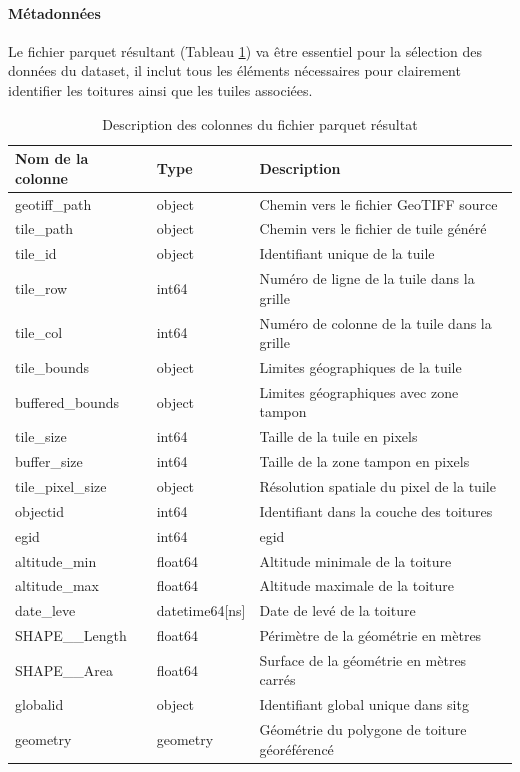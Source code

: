 \paragraph{Métadonnées}
Le fichier parquet résultant (Tableau \ref{tab:ch3_preparation_donnees_orthophotos_parquet_resultat}) va être essentiel pour la sélection des données du dataset, il inclut tous les éléments nécessaires pour clairement identifier les toitures ainsi que les tuiles associées.
\begin{table}[H]
    \centering
    \begin{tabular}{@{}llp{}@{}}
    \toprule
    \textbf{Nom de la colonne} & \textbf{Type} & \textbf{Description} \\
    \midrule
    geotiff\_path & object & Chemin vers le fichier GeoTIFF source \\
    tile\_path & object & Chemin vers le fichier de tuile généré \\
    tile\_id & object & Identifiant unique de la tuile \\
    tile\_row & int64 & Numéro de ligne de la tuile dans la grille \\
    tile\_col & int64 & Numéro de colonne de la tuile dans la grille \\
    tile\_bounds & object & Limites géographiques de la tuile \\
    buffered\_bounds & object & Limites géographiques avec zone tampon \\
    tile\_size & int64 & Taille de la tuile en pixels \\
    buffer\_size & int64 & Taille de la zone tampon en pixels \\
    tile\_pixel\_size & object & Résolution spatiale du pixel de la tuile \\
    objectid & int64 & Identifiant dans la couche des toitures \\
    egid & int64 & \gls{egid} \\
    altitude\_min & float64 & Altitude minimale de la toiture \\
    altitude\_max & float64 & Altitude maximale de la toiture\\
    date\_leve & datetime64[ns] & Date de levé de la toiture \\
    SHAPE\_\_Length & float64 & Périmètre de la géométrie en mètres \\
    SHAPE\_\_Area & float64 & Surface de la géométrie en mètres carrés \\
    globalid & object & Identifiant global unique dans \acrshort{sitg} \\
    geometry & geometry & Géométrie du polygone de toiture géoréférencé \\
    \bottomrule
    \end{tabular}
    \caption{Description des colonnes du fichier parquet résultat}
    \label{tab:ch3_preparation_donnees_orthophotos_parquet_resultat}
\end{table}

